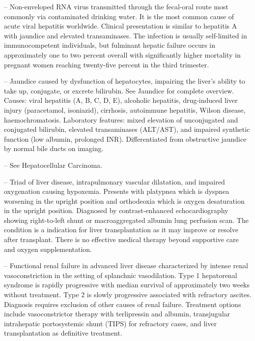 -- Non-enveloped RNA virus transmitted through the fecal-oral route most commonly via contaminated drinking water. It is the most common cause of acute viral hepatitis worldwide. Clinical presentation is similar to hepatitis A with jaundice and elevated transaminases. The infection is usually self-limited in immunocompetent individuals, but fulminant hepatic failure occurs in approximately one to two percent overall with significantly higher mortality in pregnant women reaching twenty-five percent in the third trimester.

-- Jaundice caused by dysfunction of hepatocytes, impairing the liver's ability to take up, conjugate, or excrete bilirubin. See Jaundice for complete overview. Causes: viral hepatitis (A, B, C, D, E), alcoholic hepatitis, drug-induced liver injury (paracetamol, isoniazid), cirrhosis, autoimmune hepatitis, Wilson disease, haemochromatosis. Laboratory features: mixed elevation of unconjugated and conjugated bilirubin, elevated transaminases (ALT/AST), and impaired synthetic function (low albumin, prolonged INR). Differentiated from obstructive jaundice by normal bile ducts on imaging.

-- See Hepatocellular Carcinoma.

-- Triad of liver disease, intrapulmonary vascular dilatation, and impaired oxygenation causing hypoxemia. Presents with platypnea which is dyspnea worsening in the upright position and orthodeoxia which is oxygen desaturation in the upright position. Diagnosed by contrast-enhanced echocardiography showing right-to-left shunt or macroaggregated albumin lung perfusion scan. The condition is a indication for liver transplantation as it may improve or resolve after transplant. There is no effective medical therapy beyond supportive care and oxygen supplementation.

-- Functional renal failure in advanced liver disease characterized by intense renal vasoconstriction in the setting of splanchnic vasodilation. Type 1 hepatorenal syndrome is rapidly progressive with median survival of approximately two weeks without treatment. Type 2 is slowly progressive associated with refractory ascites. Diagnosis requires exclusion of other causes of renal failure. Treatment options include vasoconstrictor therapy with terlipressin and albumin, transjugular intrahepatic portosystemic shunt (TIPS) for refractory cases, and liver transplantation as definitive treatment.

